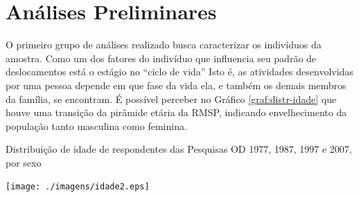 \clearpage
\section{Análises Preliminares}\label{sec:analises-preliminares}

O primeiro grupo de análises realizado busca caracterizar os indivíduos da amostra. Como um dos fatores do indivíduo que influencia seu padrão de deslocamentos está o estágio no ``ciclo de vida''%
Isto é, as atividades desenvolvidas por uma pessoa depende em que fase da vida ela, e também os demais membros da família, se encontram. É possível perceber no Gráfico \ref{graf:distr-idade} que houve uma transição da pirâmide etária da RMSP, indicando envelhecimento da população tanto masculina como feminina.

\begin{grafico}[htb]%
    \caption{\label{graf:distr-idade}Distribuição de idade de respondentes das Pesquisas OD 1977, 1987, 1997 e 2007, por sexo}%
    \begin{center}%
        \texttt{[image: ./imagens/idade2.eps]}%
    \end{center}%
\end{grafico}%

